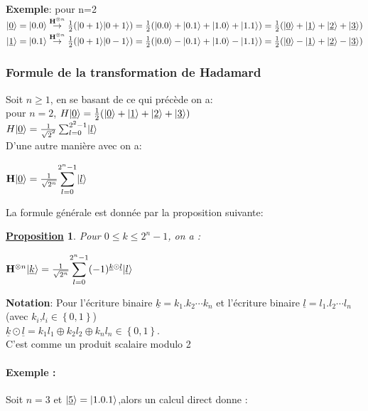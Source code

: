 \documentclass[12pt,openany]{report}
\newtheorem{proposition}{\underline{Proposition}}
\DeclarePairedDelimiter\ket{\lvert}{\rangle}
\begin{document}
\textbf{Exemple}: pour n=2\\
$\ket{\underline{0}}=\ket{0.0} \overset{\mathbf{H}^{\otimes n}}{\rightarrow} \frac{1}{2} (\ket{0+1} \ket{0+1})=\frac{1}{2} (\ket{0.0}+ \ket{0.1}+\ket{1.0}+\ket{1.1}) = \frac{1}{2} (\ket{\underline{0}}+\ket{\underline{1}} + \ket{\underline{2}}+\ket{\underline{3}})$\\
$\ket{\underline{1}}=\ket{0.1} \overset{\mathbf{H}^{\otimes n}}{\rightarrow} \frac{1}{2} (\ket{0+1} \ket{0-1})=\frac{1}{2} (\ket{0.0}- \ket{0.1}+\ket{1.0}-\ket{1.1}) = \frac{1}{2} (\ket{\underline{0}}-\ket{\underline{1}} + \ket{\underline{2}}-\ket{\underline{3}})$
\subsubsection{Formule de la transformation de Hadamard}
Soit $n\geq 1$, en se basant de ce qui précède on a:\\
pour $ n=2    $, $H\ket{\underline{0}}=\frac{1}{2} (\ket{\underline{0}}+\ket{\underline{1}} + \ket{\underline{2}}+\ket{\underline{3}}) $\\ 
$H\ket{\underline{0}}=\frac{1}{\sqrt{2}^2} \sum_{l=0}^{2^2 -1} \ket{\underline{l}} $\\
D'une autre  manière avec  on a:

\begin{center}
$ \mathbf{H}\ket{\underline{0}}=\frac{1}{\sqrt{2^n}}\mathlarger \sum_{l=0}^{2^n -1} \ket{\underline{l}} $
\end{center} 

La formule générale est donnée par la proposition suivante:
\begin{proposition} Pour $ 0\leq k\leq 2^n-1  $, on a :\\
\begin{center}
$  \mathbf{H}^{\otimes n}\ket{\underline{k}} =\frac{1}{\sqrt{2^n}}\mathlarger \sum_{l=0}^{2^n -1} (-1)^{\underline{k}\odot \underline{l}} \ket{\underline{l}} $
\end{center}
\end{proposition}
\textbf{Notation}: Pour l'écriture binaire $ \underline{k}=k_1 . k_2 \cdots k_n $ et l'écriture binaire $ \underline{l}=l_1. l_2 \cdots l_n $(avec $k_i $,$l_i \in \left\lbrace 0,1 \right\rbrace  $)\\
$ \underline{k}\odot \underline{l}=k_1 l_1 \oplus k_2 l_2 \oplus k_n l_n \in \left\lbrace 0,1\right\rbrace    $.\\
C'est comme un produit scalaire modulo 2
\paragraph{Exemple :\\}
Soit $n=3 $ et $\ket{\underline{5}}=\ket{1.0.1} $,alors un calcul direct donne :\\
 
\end{document}
